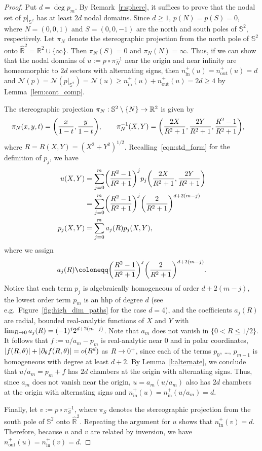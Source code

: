 \documentclass[AHL,Unicode,longabstracts,published]{cedram}
\newcommand{\R}{\mathbb{R}}
\newcommand{\sphere}{\mathbb{S}}
\newcommand{\ra}{\to}
\newcommand{\abs}[1]{\left \lvert #1 \right \rvert}
\newcommand{\nin}{n^+_{\mathrm{in}}}
\newcommand{\nout}{n^+_{\mathrm{out}}}
\newcommand{\nodal}{\mathcal{N}}
\renewcommand*{\to}{\mathchoice{\longrightarrow}{\rightarrow}{\rightarrow}{\rightarrow}}
\let\originalleft\left
\let\originalright\right
\renewcommand{\left}{\mathopen{}\mathclose\bgroup\originalleft}
\renewcommand{\right}{\aftergroup\egroup\originalright}
\newcommand{\R}{\mathbb{R}}
\begin{document}
\begin{proof}
Put $d=\deg p_m$. By Remark~\ref{r:sphere}, it suffices to prove that the nodal set of $p|_{\sphere^2}$ has at least $2d$ nodal domains. Since $d\geq 1$, $p(N)=p(S)=0$, where $N=(0,0,1)$ and $S=(0,0,-1)$ are the north and south poles of $\sphere^2$, respectively. Let $\pi_N$ denote the stereographic projection from the north pole of $\sphere^2$ onto $\widehat{\R}^2=\R^2\cup\{\infty\}$. Then $\pi_N(S)=0$ and $\pi_N(N)=\infty$. Thus, if we can show that the nodal domains of $u:=p\circ \pi_N^{-1}$ near the origin and near infinity are homeomorphic to $2d$ sectors with alternating signs, then $\nin(u)=\nout(u)=d$ and $\nodal(p)=\nodal(p|_{\sphere^2})=\nodal(u)\geq \nin(u)+\nout(u)=2d\geq 4$ by Lemma~\ref{lem:cont_comp}.

The stereographic projection $\pi_N: \sphere^2 \setminus\{N\} \ra \R^2$ is given by
\begin{align*}
\pi_N(x,y,t) & = \left(\frac{x}{1-t}, \frac{y}{1-t} \right), \qquad \pi_N^{-1}(X,Y) = \left(\frac{2X}{R^2+1}, \frac{2Y}{R^2 +1}, \frac{R^2-1}{R^2+1} \right),
\end{align*}
where $R=R(X,Y)=(X^2+Y^2)^{1/2}$. Recalling~\eqref{eqn:std_form} {for the definition of $p_j$}, we have
\begin{equation}
\begin{split}
u(X,Y) &= \sum_{j=0}^m \left(\frac{R^2-1}{R^2+1} \right)^{j} p_j\left(\frac{2X}{R^2+1}, \frac{2Y}{R^2+1} \right)\\
&= \sum_{j=0}^m \left(\frac{R^2-1}{R^2+1} \right)^{j} \left(\frac{2}{R^2+1}\right)^{d+2(m-j)}\\ p_j(X,Y) &= \sum_{j=0}^m a_j(R)p_j(X,Y),
\end{split}
\end{equation}
{where we assign}
\begin{align*}
{a_j(R) \coloneqq \left(\frac{R^2-1}{R^2+1} \right)^{j} \left(\frac{2}{R^2+1}\right)^{d+2(m-j)}.}
\end{align*}
Notice that each term $p_{j}$ is algebraically homogeneous of order $d + 2(m-j)$, the lowest order term $p_m$ is an hhp of degree $d$ (see e.g.~Figure~\ref{fig:high_dim_paths} for the case $d=4$), and the coefficients $a_j(R)$ are radial, bounded real-analytic functions of $X$ and $Y$ with $\lim_{R\to 0} a_j(R) = (-1)^j2^{d+2(m-j)}$. {Note that} $a_m$ does not vanish in $\{0<R\leq 1/2\}$. It follows that $f:=u/a_m-p_m$ is real-analytic near $0$ and in polar coordinates, $|f(R, \theta)| + \abs{\partial_\theta f(R, \theta)} = o(R^d)$ as $R \ra 0^+$, since each of the terms $p_0$, \dots, $p_{m-1}$ is homogeneous with degree at least $d+2$. By Lemma~\ref{l:alternate}, we conclude that $u/a_m=p_m+f$ has $2d$ chambers at the origin with alternating signs. Thus, since $a_m$ does not vanish near the origin, $u=a_m(u/a_m)$ also has $2d$ chambers at the origin with alternating signs and $\nin(u)=\nin(u/a_m)=d$.

Finally, let $v:=p\circ \pi_S^{-1}$, where $\pi_S$ denotes the stereographic projection from the south pole of $\sphere^2$ onto $\widehat{\R}^2$. Repeating the argument for $u$ shows that $\nin(v)=d$. Therefore, because $u$ and $v$ are related by inversion, we have $\nout(u)=\nin(v)=d$.
\end{proof}
\end{document}
